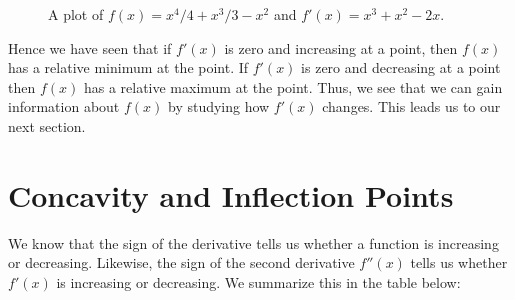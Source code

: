 \begin{example}
\begin{figure}[H]
        \caption{A plot of $f(x) =x^4/4 + x^3/3 -x^2$ and $f'(x) = x^3 + x^2 -2x$. \cite{mooc}}
        \label{figure:(x^4)/4 + (x^3)/3 -x^2}
    \end{figure}
\end{example}

Hence we have seen that if $f'(x)$ is zero and increasing at a point,
then $f(x)$ has a relative minimum at the point. If $f'(x)$ is zero and
decreasing at a point then $f(x)$ has a relative maximum at the
point. Thus, we see that we can gain information about $f(x)$ by
studying how $f'(x)$ changes. This leads us to our next section. \cite{mooc}




\section{Concavity and Inflection Points}

We know that the sign of the derivative tells us whether a function is
increasing or decreasing. Likewise, the sign of the second derivative
$f''(x)$ tells us whether $f'(x)$ is increasing or decreasing. We summarize this in the table below: \cite{mooc}\\


